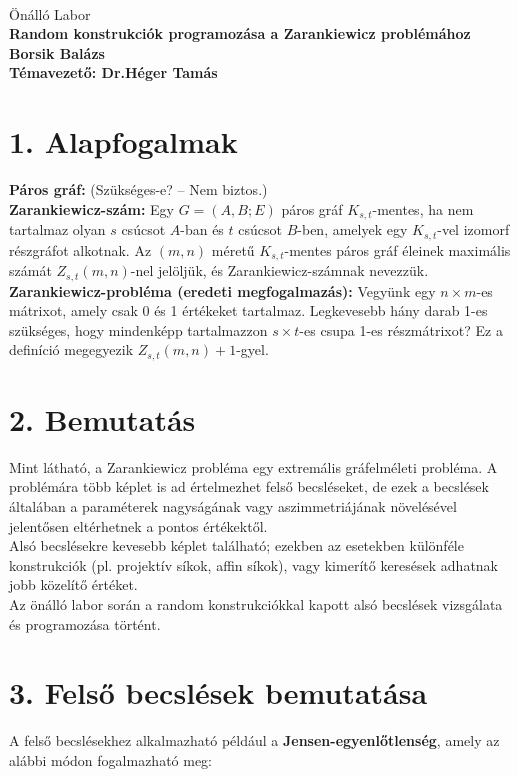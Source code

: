 \documentclass[12pt,a4paper]{article}
\begin{document}
 \ \
\vspace{2mm}
\begin{center}
{\Large\sc
Önálló Labor\\[5mm]
\bf 
Random konstrukciók programozása a Zarankiewicz problémához
\\[10mm]
{\Large
Borsik Balázs
}\\[10mm]
Témavezető: Dr.Héger Tamás
}
\end{center}
\vspace{1cm}

\section*{1. Alapfogalmak}
\textbf{Páros gráf:} (Szükséges-e? – Nem biztos.)\\[2mm]
\textbf{Zarankiewicz-szám:} Egy $G = (A,B;E)$ páros gráf $K_{s,t}$-mentes, ha nem tartalmaz olyan $s$ csúcsot $A$-ban és $t$ csúcsot $B$-ben, amelyek egy $K_{s,t}$-vel izomorf részgráfot alkotnak. Az $(m,n)$ méretű $K_{s,t}$-mentes páros gráf éleinek maximális számát $Z_{s,t}(m,n)$-nel jelöljük, és Zarankiewicz-számnak nevezzük.\\[2mm]
\textbf{Zarankiewicz-probléma (eredeti megfogalmazás):} Vegyünk egy $n \times m$-es mátrixot, amely csak 0 és 1 értékeket tartalmaz. Legkevesebb hány darab 1-es szükséges, hogy mindenképp tartalmazzon $s \times t$-es csupa 1-es részmátrixot? Ez a definíció megegyezik $Z_{s,t}(m,n) + 1$-gyel.

\section*{2. Bemutatás}
Mint látható, a Zarankiewicz probléma egy extremális gráfelméleti probléma. A problémára több képlet is ad értelmezhet felső becsléseket, de ezek a becslések általában a paraméterek nagyságának vagy aszimmetriájának növelésével jelentősen eltérhetnek a pontos értékektől.\\

Alsó becslésekre kevesebb képlet található; ezekben az esetekben különféle konstrukciók (pl. projektív síkok, affin síkok), vagy kimerítő keresések adhatnak jobb közelítő értéket.\\

Az önálló labor során a random konstrukciókkal kapott alsó becslések vizsgálata és programozása történt.

\section*{3. Felső becslések bemutatása}
A felső becslésekhez alkalmazható például a \textbf{Jensen-egyenlőtlenség}, amely az alábbi módon fogalmazható meg:
\end{document}
